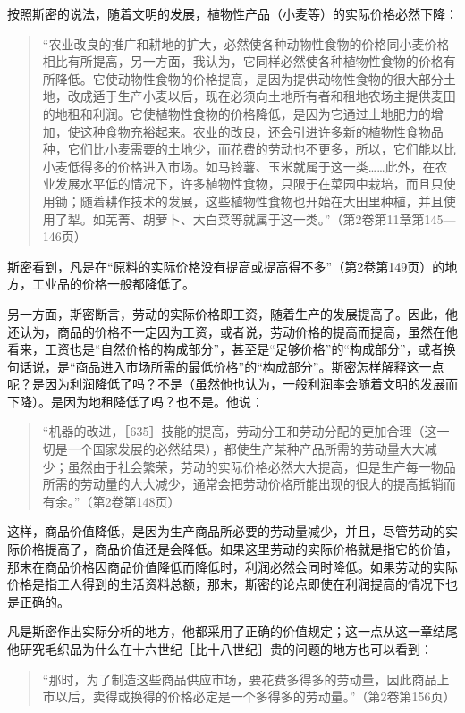 按照斯密的说法，随着文明的发展，植物性产品（小麦等）的实际价格必然下降：

\begin{quote}{“农业改良的推广和耕地的扩大，必然使各种动物性食物的价格同小麦价格相比有所提高，另一方面，我认为，它同样必然使各种植物性食物的价格有所降低。它使动物性食物的价格提高，是因为提供动物性食物的很大部分土地，改成适于生产小麦以后，现在必须向土地所有者和租地农场主提供麦田的地租和利润。它使植物性食物的价格降低，是因为它通过土地肥力的增加，使这种食物充裕起来。农业的改良，还会引进许多新的植物性食物品种，它们比小麦需要的土地少，而花费的劳动也不更多，所以，它们能以比小麦低得多的价格进入市场。如马铃薯、玉米就属于这一类……此外，在农业发展水平低的情况下，许多植物性食物，只限于在菜园中栽培，而且只使用锄；随着耕作技术的发展，这些植物性食物也开始在大田里种植，并且使用了犁。如芜菁、胡萝卜、大白菜等就属于这一类。”（第2卷第11章第145—146页）}\end{quote}

斯密看到，凡是在“原料的实际价格没有提高或提高得不多”（第2卷第149页）的地方，工业品的价格一般都降低了。

另一方面，斯密断言，劳动的实际价格即工资，随着生产的发展提高了。因此，他还认为，商品的价格不一定因为工资，或者说，劳动价格的提高而提高，虽然在他看来，工资也是“自然价格的构成部分”，甚至是“足够价格”的“构成部分”，或者换句话说，是“商品进入市场所需的最低价格”的“构成部分”。斯密怎样解释这一点呢？是因为利润降低了吗？不是（虽然他也认为，一般利润率会随着文明的发展而下降）。是因为地租降低了吗？也不是。他说：

\begin{quote}{“机器的改进，［635］技能的提高，劳动分工和劳动分配的更加合理（这一切是一个国家发展的必然结果），都使生产某种产品所需的劳动量大大减少；虽然由于社会繁荣，劳动的实际价格必然大大提高，但是生产每一物品所需的劳动量的大大减少，通常会把劳动价格所能出现的很大的提高抵销而有余。”（第2卷第148页）}\end{quote}

这样，商品价值降低，是因为生产商品所必要的劳动量减少，并且，尽管劳动的实际价格提高了，商品价值还是会降低。如果这里劳动的实际价格就是指它的价值，那末在商品价格因商品价值降低而降低时，利润必然会同时降低。如果劳动的实际价格是指工人得到的生活资料总额，那末，斯密的论点即使在利润提高的情况下也是正确的。

凡是斯密作出实际分析的地方，他都采用了正确的价值规定；这一点从这一章结尾他研究毛织品为什么在十六世纪［比十八世纪］贵的问题的地方也可以看到：

\begin{quote}{“那时，为了制造这些商品供应市场，要花费多得多的劳动量，因此商品上市以后，卖得或换得的价格必定是一个多得多的劳动量。”（第2卷第156页）}\end{quote}


